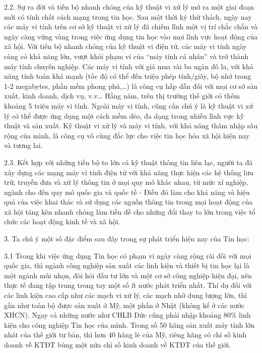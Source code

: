 \documentclass[11pt, a4paper, reqno, oneside]{book}
\begin{document}
2.2.	Sự ra đời và tiến bộ nhanh chóng của kỹ thuật vi xử lý mở ra một giai đoạn mới có tính chất cách mạng trong tin học. Sau một thời ký thử thách, ngày nay các máy vi tính trên cơ sở kỹ thuật vi xử lý đã chiếm lĩnh một vị trí chắc chắn và ngày càng vững vàng trong việc ứng dụng tin học vào mọi lĩnh vực hoạt động của xã hội. Với tiến bộ nhanh chóng của kỹ thuật vi điện tử, các máy vi tính ngày càng có khả năng lớn, vượt khỏi phạm vi của “máy tính cá nhân” và trở thành máy tính chuyên nghiệp. Các máy vi tính với giá mua vài ba ngàn đô la, với khả năng tính toán khá mạnh (tốc độ có thể đến triệu phép tính/giây, bộ nhớ trong 1-2 megabytes, phần mềm phong phú,…) là công cụ hấp dẫn đối với mọi cơ sở sản xuất, kinh doanh, dịch vụ, v.v… Hằng năm, trên thị trường thế giới có thêm khoảng 5 triệu máy vi tính. Ngoài máy vi tính, cũng cần chú ý là kỹ thuật vi xử lý có thể được ứng dụng một cách mềm dẻo, đa dạng trong nhiều lĩnh vực kỹ thuật và sản xuất. Kỹ thuật vi xử lý và máy vi tính, với khả năng thâm nhập sâu rộng của mình, là công cụ vô cùng đắc lực cho việc tin học hóa xã hội hiện nay và tương lai.


2.3.	Kết hợp với những tiến bộ to lớn cả kỹ thuật thông tin liên lạc, người ta đã xây dựng các mạng máy vi tính điện tử với khả năng thực hiện các hệ thống lưu trữ, truyền đưa và xử lý thông tin ở mọi quy mô khác nhau, từ mức xí nghiệp, ngành cho đến quy mô quốc gia và quốc tế - Điều đó làm cho khả năng và hiệu quả của việc khai thác và sử dụng các nguồn thông tin trong mọi hoạt động của xã hội tăng kên nhanh chóng làm tiền đề cho những đổi thay to lớn trong việc tổ chức các hoạt động kinh tế và xã hội.


3.	Ta chú ý một số đặc điểm sau đây trong sự phát triển hiện nay của Tin học:


3.1	Trong khi việc ứng dụng Tin học có phạm vi ngày càng rộng rãi đối với mọi quốc gia, thì ngành công nghiệp sản xuất các linh kiện và thiết bị tin học lại là một ngành mũi nhọn, đòi hỏi đầu tư lớn và một cơ sở công nghiệp hiện đại, nên thực tế đang tập trung trong tay một số ít nước phát triển nhất. Thí dụ đối với các linh kiện cao cấp như các mạch vi xử lý, các mạch nhớ dung lượng lớn, thì gần như toàn bộ được sản xuất ở Mỹ, một phần ở Nhật (không kể ở các nước XHCN). Ngay cả những nước như CHLB Đức cũng phải nhập khoảng 80\% linh kiện cho công nghiệp Tin học của mình. Trong số 50 hãng sản xuất máy tính lớn nhát của thế giới tư bản, thì hơn 40 hãng lẻ của Mỹ, riêng hãng có chỉ số kinh doanh về KTĐT bùng một nửa chỉ số kinh doanh về KTĐT của thế giới.
\end{document}
